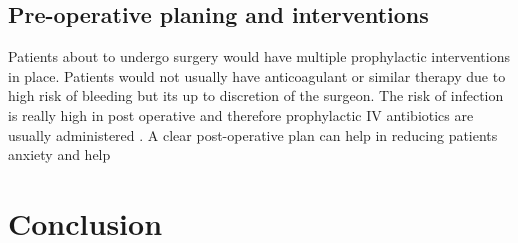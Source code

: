 \documentclass[a4paper,man,british]{apa6}
\begin{document}
\subsection{Pre-operative planing and interventions}

Patients about to undergo surgery would have multiple prophylactic interventions in place. Patients would not usually have anticoagulant  or similar therapy due to high risk of bleeding but its up to discretion of the surgeon. The risk of infection is really high in post operative and therefore prophylactic IV antibiotics are usually administered \parencite{lundine_adherence_2010}.
A clear post-operative plan can help in reducing patients anxiety and help 




\section{} %




\newpage
\section{Conclusion}%



\printbibliography
\end{document}
